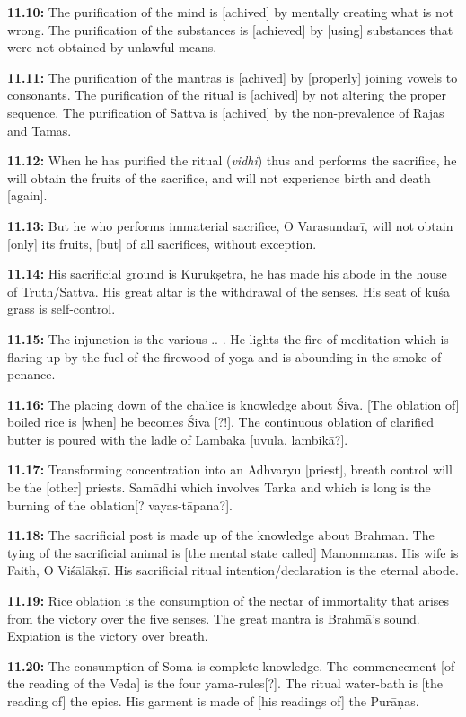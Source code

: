\documentclass{article}
\newcommand{\vsnum}[1]{\textbf{#1}}
\newcommand{\skt}[1]{\textit{#1}}
\begin{document}
\vsnum{11.10: }The purification of the mind is [achived] by mentally creating what is not wrong. The purification of the substances is [achieved] by [using] substances that were not obtained by unlawful means.

\vsnum{11.11: }The purification of the mantras is [achived] by [properly] joining vowels to consonants. The purification of the ritual is [achived] by not altering the proper sequence. The purification of Sattva is [achived] by the non-prevalence of Rajas and Tamas.

\vsnum{11.12: }When he has purified the ritual (\skt{vidhi}) thus and performs the sacrifice, he will obtain the fruits of the sacrifice, and will not experience birth and death [again].

\vsnum{11.13: }But he who performs immaterial sacrifice, O Varasundarī, will not obtain [only] its fruits, [but] of all sacrifices, without exception.

\vsnum{11.14: }His sacrificial ground is Kurukṣetra, he has made his abode in the house of Truth/Sattva. His great altar is the withdrawal of the senses. His seat of kuśa grass is self-control.

\vsnum{11.15: }The injunction is the various .. . He lights the fire of meditation which is flaring up by the fuel of the firewood of yoga and is abounding in the smoke of penance.

\vsnum{11.16: }The placing down of the chalice is knowledge about Śiva. [The oblation of] boiled rice is [when] he becomes Śiva [?!]. The continuous oblation of clarified butter is poured with the ladle of Lambaka [uvula, lambikā?].

\vsnum{11.17: }Transforming concentration into an Adhvaryu [priest], breath control will be the [other] priests. Samādhi which involves Tarka and which is long is the burning of the oblation[? vayas-tāpana?].

\vsnum{11.18: }The sacrificial post is made up of the knowledge about Brahman. The tying of the sacrificial animal is [the mental state called] Manonmanas. His wife is Faith, O Viśālākṣī. His sacrificial ritual intention/declaration is the eternal abode.

\vsnum{11.19: }Rice oblation is the consumption of the nectar of immortality that arises from the victory over the five senses. The great mantra is Brahmā's sound. Expiation is the victory over breath.

\vsnum{11.20: }The consumption of Soma is complete knowledge. The commencement [of the reading of the Veda] is the four yama-rules[?]. The ritual water-bath is [the reading of] the epics. His garment is made of [his readings of] the Purāṇas.
\end{document}

